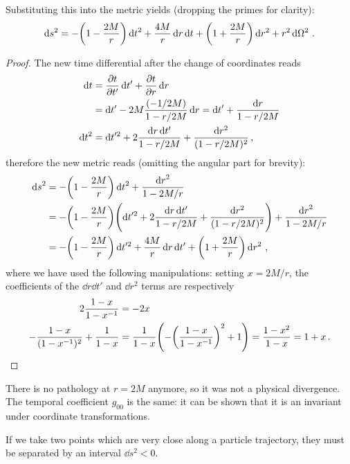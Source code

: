 \documentclass[main.tex]{subfiles}
\begin{document}
\begin{claim}
Substituting this into the metric yields (dropping the primes for clarity):
%
\begin{align}
\dd{s^2} = - \qty(1 - \frac{2M}{r}) \dd{t}^2
+ \frac{4M}{r} \dd{r} \dd{t} + \qty(1 + \frac{2M}{r}) \dd{r^2}
+ r^2 \dd{\Omega^2}
\,.
\end{align}
\end{claim}

\begin{proof}
The new time differential after the change of coordinates reads 
%
\begin{align}
\dd{t} &= \pdv{t}{t'} \dd{t'} + \pdv{t}{r} \dd{r}  \\
&= \dd{t'} - 2M \frac{(-1/2M)}{1 - r/2M} \dd{r} = \dd{t}' + \frac{ \dd{r}}{1 - r / 2M}  \\
\dd{t}^2 &= \dd{t}^{\prime 2} 
+2 \frac{ \dd{r} \dd{t'}}{1 - r/2M} 
+ \frac{ \dd{r^2}}{(1 - r / 2M)^2}
\,,
\end{align}
%
therefore the new metric reads (omitting the angular part for brevity):
%
\begin{align}
\dd{s}^2 
&= - \qty(1- \frac{2M}{r}) \dd{t}^2 + \frac{ \dd{r}^2}{1 - 2M / r}  \\
&= - \qty(1- \frac{2M}{r}) \qty(\dd{t}^{\prime 2} 
+2 \frac{ \dd{r} \dd{t'}}{1 - r/2M} 
+ \frac{ \dd{r^2}}{(1 - r / 2M)^2}) + \frac{ \dd{r}^2}{1 - 2M / r}  \\
&= - \qty(1 - \frac{2M}{r}) \dd{t^{\prime 2}} + \frac{4M}{r} \dd{r} \dd{t'} + \qty(1 + \frac{2M}{r}) \dd{r^2}
\,,
\end{align}
%
where we have used the following manipulations: setting \(x = 2M / r\), the coefficients of the \(\dd{r} \dd{t}'\) and \(\dd{r^2}\) terms are respectively
%
\begin{align}
2\frac{1 - x}{1 - x^{-1}} &= -2x  \\
-\frac{1 -x}{(1- x^{-1})^2} + \frac{1}{1-x} &= \frac{1}{1-x} \qty(-\qty(\frac{1-x}{1- x^{-1}})^2 + 1) =  \frac{1-x^2}{1-x} = 1+x
\,.
\end{align}
\end{proof}

There is no pathology at \(r = 2M\) anymore, so it was not a physical divergence. 
The temporal coefficient \(g_{00} \) is the same: it can be shown that it is an invariant under coordinate transformations. 

If we take two points which are very close along a particle trajectory, they must be separated by an interval \(\dd{s}^2 < 0\). 
\end{document}
